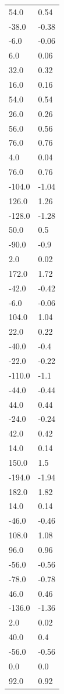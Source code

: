\begin{longtable}{ll}
54.0 & 0.54 \\
-38.0 & -0.38 \\
-6.0 & -0.06 \\
6.0 & 0.06 \\
32.0 & 0.32 \\
16.0 & 0.16 \\
54.0 & 0.54 \\
26.0 & 0.26 \\
56.0 & 0.56 \\
76.0 & 0.76 \\
4.0 & 0.04 \\
76.0 & 0.76 \\
-104.0 & -1.04 \\
126.0 & 1.26 \\
-128.0 & -1.28 \\
50.0 & 0.5 \\
-90.0 & -0.9 \\
2.0 & 0.02 \\
172.0 & 1.72 \\
-42.0 & -0.42 \\
-6.0 & -0.06 \\
104.0 & 1.04 \\
22.0 & 0.22 \\
-40.0 & -0.4 \\
-22.0 & -0.22 \\
-110.0 & -1.1 \\
-44.0 & -0.44 \\
44.0 & 0.44 \\
-24.0 & -0.24 \\
42.0 & 0.42 \\
14.0 & 0.14 \\
150.0 & 1.5 \\
-194.0 & -1.94 \\
182.0 & 1.82 \\
14.0 & 0.14 \\
-46.0 & -0.46 \\
108.0 & 1.08 \\
96.0 & 0.96 \\
-56.0 & -0.56 \\
-78.0 & -0.78 \\
46.0 & 0.46 \\
-136.0 & -1.36 \\
2.0 & 0.02 \\
40.0 & 0.4 \\
-56.0 & -0.56 \\
0.0 & 0.0 \\
92.0 & 0.92 \\

\end{longtable}
